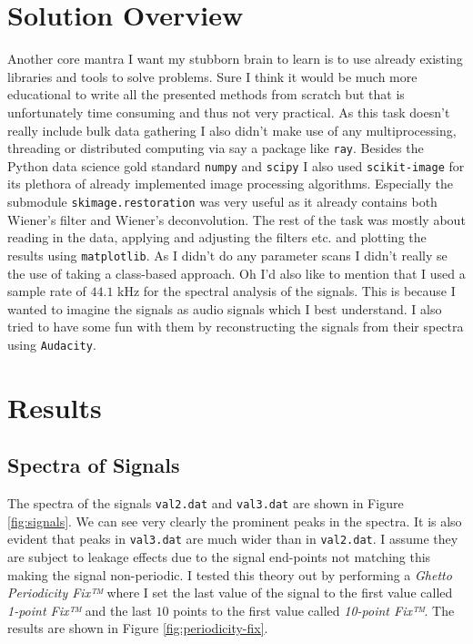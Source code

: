 \documentclass[10pt, titlepage, a4paper]{article}
\begin{document}
\section{Solution Overview}
Another core mantra I want my stubborn brain to learn is to use already existing libraries and tools to solve problems. Sure I think it would be much more 
educational to write all the presented methods from scratch but that is unfortunately time consuming and thus not very practical. As this task doesn't really 
include bulk data gathering I also didn't make use of any multiprocessing, threading or distributed computing via say a package like \texttt{ray}. Besides the 
Python data science gold standard \texttt{numpy} and \texttt{scipy} I also used \texttt{scikit-image} for its plethora of already implemented image processing 
algorithms. Especially the submodule \texttt{skimage.restoration} was very useful as it already contains both Wiener's filter and Wiener's deconvolution. The rest 
of the task was mostly about reading in the data, applying and adjusting the filters etc. and plotting the results using \texttt{matplotlib}. As I didn't do any parameter 
scans I didn't really se the use of taking a class-based approach. Oh I'd also like to mention that I used a sample rate of $44.1$ kHz for 
the spectral analysis of the signals. This is because I wanted to imagine the signals as audio signals which I best understand. I also tried to have some 
fun with them by reconstructing the signals from their spectra using \texttt{Audacity}. 
\section{Results}
\subsection{Spectra of Signals}
The spectra of the signals \texttt{val2.dat} and \texttt{val3.dat} are shown in Figure \ref{fig:signals}. We can see very clearly the prominent peaks in the spectra.
It is also evident that peaks in \texttt{val3.dat} are much wider than in \texttt{val2.dat}. I assume they are subject to leakage effects due to the 
signal end-points not matching this making the signal non-periodic. I tested this theory out by performing a \textit{Ghetto Periodicity Fix™} where I set the 
last value of the signal to the first value called \textit{1-point Fix™} and the last $10$ points to the first value called \textit{10-point Fix™}. The results are
shown in Figure \ref{fig:periodicity-fix}.
\end{document}
